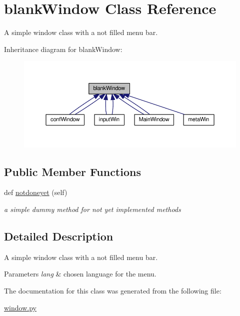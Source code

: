 \hypertarget{classgui_1_1window_1_1blankWindow}{}\section{blank\+Window Class Reference}
\label{classgui_1_1window_1_1blankWindow}


A simple window class with a not filled menu bar.  




Inheritance diagram for blank\+Window\+:
\nopagebreak
\begin{figure}[H]
\begin{center}
\leavevmode
\includegraphics[width=350pt]{classgui_1_1window_1_1blankWindow__inherit__graph}
\end{center}
\end{figure}
\subsection*{Public Member Functions}
\begin{DoxyCompactItemize}
\item 
def \hyperlink{classgui_1_1window_1_1blankWindow_a2d865a6aea10146f28c546bed4ae1f44}{notdoneyet} (self)\hypertarget{classgui_1_1window_1_1blankWindow_a2d865a6aea10146f28c546bed4ae1f44}{}\label{classgui_1_1window_1_1blankWindow_a2d865a6aea10146f28c546bed4ae1f44}

\begin{DoxyCompactList}\small\item\em a simple dummy method for not yet implemented methods \end{DoxyCompactList}\end{DoxyCompactItemize}


\subsection{Detailed Description}
A simple window class with a not filled menu bar. 


\begin{DoxyParams}{Parameters}
{\em lang} & chosen language for the menu. \\
\hline
\end{DoxyParams}


The documentation for this class was generated from the following file\+:\begin{DoxyCompactItemize}
\item 
\hyperlink{window_8py}{window.\+py}\end{DoxyCompactItemize}
